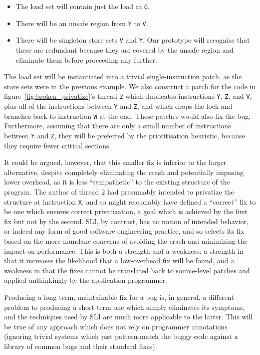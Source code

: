 \documentclass[10pt,twocolumn,preprint,natbib,authoryear]{sigplanconf}
\newcommand{\editorial}[1]{}
\begin{document}
\begin{itemize}
\item The load set will contain just the load at \verb|G|.
\item There will be an unsafe region from \verb|Y| to \verb|V|. 
\item There will be singleton store sets \verb|V| and \verb|Y|.  Our
  prototype will recognise that these are redundant because they are
  covered by the unsafe region and eliminate them before proceeding
  any further.
\end{itemize}

The load set will be instantiated into a trivial single-instruction
patch, as the store sets were in the previous example.  We also
construct a patch for the code in figure~\ref{fig:broken_privatize}'s
thread 2 which duplicates instructions \verb|Y|, \verb|Z|, and
\verb|V|, plus all of the instructions between \verb|Y| and \verb|Z|,
and which drops the lock and branches back to instruction \verb|W| at
the end.  These patches would also fix the bug.  Furthermore, assuming
that there are only a small number of instructions between \verb|Y|
and \verb|Z|, they will be preferred by the prioritisation heuristic,
because they require fewer critical sections.

It could be argued, however, that this smaller fix is inferior to the
larger alternative, despite completely eliminating the crash and
potentially imposing lower overhead, as it is less ``sympathetic'' to
the existing structure of the program.  The author of thread 2 had
presumably intended to privatize the structure at instruction
\verb|X|, and so might reasonably have defined a ``correct'' fix to be
one which ensures correct privatization, a goal which is achieved by
the first fix but not by the second.  SLI, by contrast, has no notion
of intended behavior, or indeed any form of good software engineering
practice, and so selects its fix based on the more mundane concerns of
avoiding the crash and minimizing the impact on performance.  This is
both a strength and a weakness: a strength in that it increases the
likelihood that a low-overhead fix will be found, and a weakness in
that the fixes cannot be translated back to source-level patches and
applied unthinkingly by the application programmer.

Producing a long-term, maintainable fix for a bug is, in general, a
different problem to producing a short-term one which simply
eliminates its symptoms, and the techniques used by SLI are much more
applicable to the latter.  This will be true of any approach which
does not rely on programmer annotations (ignoring trivial systems
which just pattern-match the buggy code against a library of common
bugs and their standard fixes).\editorial{This could do with being a
  bit earlier.}
\end{document}
